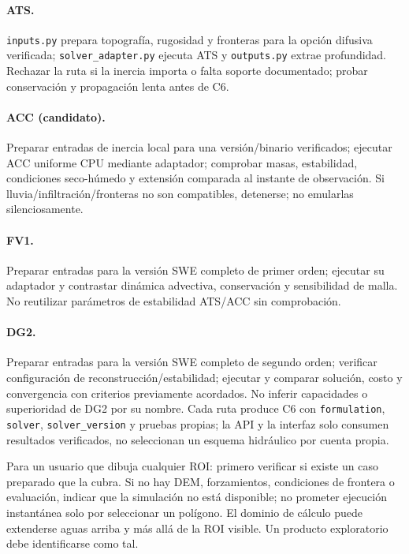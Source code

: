 \documentclass[11pt,a4paper]{article}
\begin{document}
\paragraph{ATS.} \texttt{inputs.py} prepara topografía, rugosidad y fronteras para la opción difusiva verificada; \texttt{solver\_adapter.py} ejecuta ATS y \texttt{outputs.py} extrae profundidad. Rechazar la ruta si la inercia importa o falta soporte documentado; probar conservación y propagación lenta antes de C6.
\paragraph{ACC (candidato).} Preparar entradas de inercia local para una versión/binario verificados; ejecutar ACC uniforme CPU mediante adaptador; comprobar masas, estabilidad, condiciones seco-húmedo y extensión comparada al instante de observación. Si lluvia/infiltración/fronteras no son compatibles, detenerse; no emularlas silenciosamente.
\paragraph{FV1.} Preparar entradas para la versión SWE completo de primer orden; ejecutar su adaptador y contrastar dinámica advectiva, conservación y sensibilidad de malla. No reutilizar parámetros de estabilidad ATS/ACC sin comprobación.
\paragraph{DG2.} Preparar entradas para la versión SWE completo de segundo orden; verificar configuración de reconstrucción/estabilidad; ejecutar y comparar solución, costo y convergencia con criterios previamente acordados. No inferir capacidades o superioridad de DG2 por su nombre.
Cada ruta produce C6 con \texttt{formulation}, \texttt{solver}, \texttt{solver\_version} y pruebas propias; la API y la interfaz solo consumen resultados verificados, no seleccionan un esquema hidráulico por cuenta propia.

Para un usuario que dibuja cualquier ROI: primero verificar si existe un caso preparado que la cubra. Si no hay DEM, forzamientos, condiciones de frontera o evaluación, indicar que la simulación no está disponible; no prometer ejecución instantánea solo por seleccionar un polígono. El dominio de cálculo puede extenderse aguas arriba y más allá de la ROI visible. Un producto exploratorio debe identificarse como tal.
\end{document}
